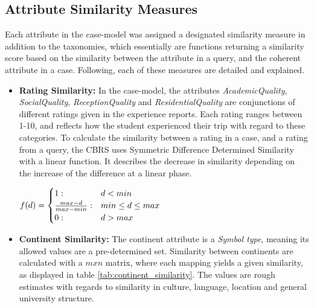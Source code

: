 \subsection{Attribute Similarity Measures}
Each attribute in the case-model was assigned a designated similarity measure in addition to the taxonomies, which essentially are functions returning a similarity score based on the similarity between the attribute in a query, and the coherent attribute in a case. Following, each of these measures are detailed and explained.

\begin{itemize}
    \item \textbf{Rating Similarity:} In the case-model, the attributes \emph{AcademicQuality}, \emph{SocialQuality}, \emph{ReceptionQuality} and \emph{ResidentialQuality} are conjunctions of different ratings given in the experience reports. Each rating ranges between 1-10, and reflects how the student experienced their trip with regard to these categories. To calculate the similarity between a rating in a case, and a rating from a query, the CBRS uses Symmetric Difference Determined Similarity\cite{bergmann2002experience} with a linear function. It describes the decrease in similarity depending on the increase of the difference at a linear phase.
    
$\begin{displaystyle}
    f(d) = 
    \begin{cases} 1 : & d < min \\ 
    \frac{max-d}{max-min} : & min \leq d \leq max \\
    0 : & d > max
    \end{cases}
\end{displaystyle}$

    \item \textbf{Continent Similarity:} The continent attribute is a \emph{Symbol type}, meaning its allowed values are a pre-determined set. Similarity between continents are calculated with a $m x n$ matrix, where each mapping yields a given similarity, as displayed in table \ref{tab:continent_similarity}. The values are rough estimates with regards to similarity in culture, language, location and general university structure.


\end{itemize}
